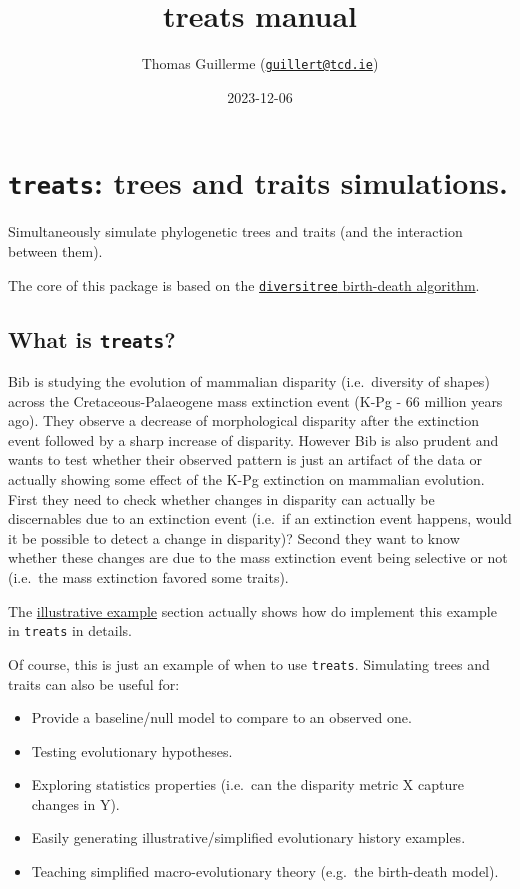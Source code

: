 \documentclass[
]{book}
\title{treats manual}
\author{Thomas Guillerme (\href{mailto:guillert@tcd.ie}{\nolinkurl{guillert@tcd.ie}})}
\date{2023-12-06}
\providecommand{\tightlist}{%
  \setlength{\itemsep}{0pt}\setlength{\parskip}{0pt}}
\begin{document}
\maketitle

{
\setcounter{tocdepth}{1}
\tableofcontents
}
\hypertarget{treats-trees-and-traits-simulations.}{%
\chapter{\texorpdfstring{\texttt{treats}: trees and traits simulations.}{treats: trees and traits simulations.}}\label{treats-trees-and-traits-simulations.}}

Simultaneously simulate phylogenetic trees and traits (and the interaction between them).

The core of this package is based on the \href{https://github.com/cran/diversitree/blob/master/R/simulate-bd.R}{\texttt{diversitree} birth-death algorithm}.

\hypertarget{what-is-treats}{%
\section{\texorpdfstring{What is \texttt{treats}?}{What is treats?}}\label{what-is-treats}}

Bib is studying the evolution of mammalian disparity (i.e.~diversity of shapes) across the Cretaceous-Palaeogene mass extinction event (K-Pg - 66 million years ago).
They observe a decrease of morphological disparity after the extinction event followed by a sharp increase of disparity.
However Bib is also prudent and wants to test whether their observed pattern is just an artifact of the data or actually showing some effect of the K-Pg extinction on mammalian evolution.
First they need to check whether changes in disparity can actually be discernables due to an extinction event (i.e.~if an extinction event happens, would it be possible to detect a change in disparity)?
Second they want to know whether these changes are due to the mass extinction event being selective or not (i.e.~the mass extinction favored some traits).

The \protect\hyperlink{kpgexample}{illustrative example} section actually shows how do implement this example in \texttt{treats} in details.

Of course, this is just an example of when to use \texttt{treats}.
Simulating trees and traits can also be useful for:

\begin{itemize}
\tightlist
\item
  Provide a baseline/null model to compare to an observed one.
\item
  Testing evolutionary hypotheses.
\item
  Exploring statistics properties (i.e.~can the disparity metric X capture changes in Y).
\item
  Easily generating illustrative/simplified evolutionary history examples.
\item
  Teaching simplified macro-evolutionary theory (e.g.~the birth-death model).
\end{itemize}
\end{document}
